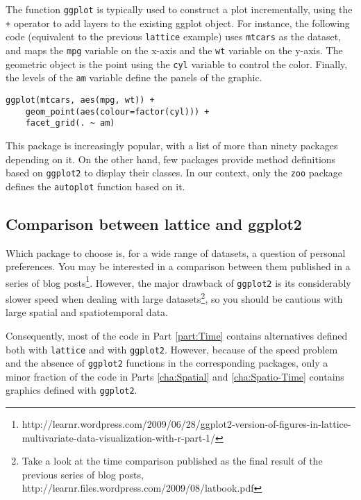 The function \texttt{ggplot} is typically used to construct a plot
incrementally, using the \texttt{+} operator to add layers to the
existing ggplot object.  For instance, the following code (equivalent to
the previous \texttt{lattice} example) uses \texttt{mtcars} as
the dataset, and maps the \texttt{mpg} variable on the x-axis and the
\texttt{wt} variable on the y-axis. The geometric object is the point
using the \texttt{cyl} variable to control the color. Finally, the
levels of the \texttt{am} variable define the panels of the graphic.

\lstset{language=R,numbers=none}
\begin{lstlisting}
ggplot(mtcars, aes(mpg, wt)) +
    geom_point(aes(colour=factor(cyl))) +
    facet_grid(. ~ am)
\end{lstlisting}
 
This package is increasingly popular, with a list of more than ninety
packages depending on it. On the other hand, few packages provide
method definitions based on \texttt{ggplot2} to display their
classes. In our context, only the \texttt{zoo} package defines the
\texttt{autoplot} function based on it.

\subsection{Comparison between lattice and ggplot2}
\label{sec:comparison}

Which package to choose is, for a wide range of datasets, a question
of personal preferences. You may be interested in a comparison
between them published in a series of blog
posts\footnote{http://learnr.wordpress.com/2009/06/28/ggplot2-version-of-figures-in-lattice-multivariate-data-visualization-with-r-part-1/}.
However, the major drawback of \texttt{ggplot2} is its considerably
slower speed when dealing with large datasets\footnote{Take a look at
  the time comparison published as the final result of the previous
  series of blog posts,
  http://learnr.files.wordpress.com/2009/08/latbook.pdf}, so you
should be cautious with large spatial and spatiotemporal data.

Consequently, most of the code in Part \ref{part:Time} contains
alternatives defined both with \texttt{lattice} and with
\texttt{ggplot2}. However, because of the speed problem and the
absence of \texttt{ggplot2} functions in the corresponding packages,
only a minor fraction of the code in Parts \ref{cha:Spatial} and
\ref{cha:Spatio-Time} contains graphics defined with \texttt{ggplot2}.
  

